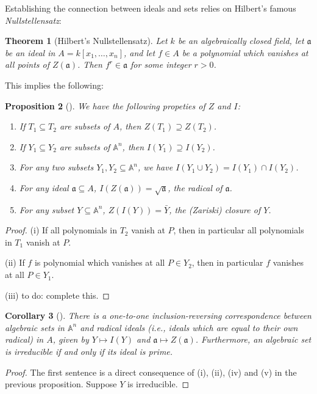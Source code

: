 \documentclass[12pt]{amsart}
\newcommand{\An}{\mathbb{A}^n}
\renewcommand{\a}{\mathfrak{a}}
\newtheorem{theorem}{Theorem}[subsection]
\newtheorem{corollary}[theorem]{Corollary}
\newtheorem{proposition}[theorem]{Proposition}
\theoremstyle{remark}
\theoremstyle{remark}
\theoremstyle{remark}
\begin{document}
Establishing the connection between ideals and sets relies on Hilbert's famous \emph{Nullstellensatz}:

\begin{theorem}[Hilbert's Nullstellensatz]
Let $k$ be an algebraically closed field, let $\a$ be an ideal in $A = k[x_1, \dots, x_n]$, and let $f \in A$ be a polynomial which vanishes at all points of $Z(\a)$.
Then $f^r \in \a$ for some integer $r > 0$.
\end{theorem}

This implies the following:

\begin{proposition}[{\cite[Prop 1.2]{Hartshorne77}}]
We have the following propeties of $Z$ and $I$:
\begin{enumerate}[label=(\roman*)]
\item
If $T_1 \subseteq T_2$ are subsets of $A$, then $Z(T_1) \supseteq Z(T_2)$.

\item
If $Y_1 \subseteq Y_2$ are subsets of $\An$, then $I(Y_1) \supseteq I(Y_2)$.

\item
For any two subsets $Y_1, Y_2 \subseteq \An$, we have $I(Y_1 \cup Y_2) = I(Y_1) \cap I(Y_2)$.

\item
For any ideal $\a \subseteq A$, $I(Z(\a)) = \sqrt{\a}$, the radical of $\a$.

\item
For any subset $Y \subseteq \An$, $Z(I(Y)) = \bar Y$, the (Zariski) closure of $Y$.
\end{enumerate}
\end{proposition}
\begin{proof}
(i) If all polynomials in $T_2$ vanish at $P$, then in particular all polynomials in $T_1$ vanish at $P$.

(ii) If $f$ is polynomial which vanishes at all $P \in Y_2$, then in particular $f$ vanishes at all $P \in Y_1$.

(iii) to do: complete this.
\end{proof}

\begin{corollary}[{\cite[Coro 1.4]{Hartshorne77}}]
There is a one-to-one inclusion-reversing correspondence between algebraic sets in $\An$ and radical ideals (i.e., ideals which are equal to their own radical) in $A$, given by $Y \mapsto I(Y)$ and $\a \mapsto Z(\a)$.
Furthermore, an algebraic set is irreducible if and only if its ideal is prime.
\end{corollary}
\begin{proof}
The first sentence is a direct consequence of (i), (ii), (iv) and (v) in the previous proposition.
Suppose $Y$ is irreducible.

\end{proof}
\end{document}
